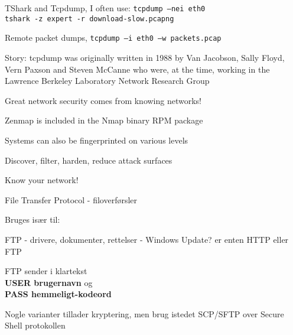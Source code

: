 \documentclass[Screen16to9,17pt]{foils}
\begin{document}
\begin{list2}
\item TShark and Tcpdump, I often use: \verb+tcpdump –nei eth0+\\
\verb+tshark -z expert -r download-slow.pcapng+

\item Remote packet dumps, \verb+tcpdump –i eth0 –w packets.pcap+

\item Story: tcpdump was originally written in 1988 by Van Jacobson, Sally Floyd, Vern Paxson and Steven McCanne who were, at the time, working in the Lawrence Berkeley Laboratory Network Research Group\\
\end{list2}

\vskip 5mm

\centerline{\Large Great network security comes from knowing networks!}





\centerline{Zenmap is included in the Nmap binary RPM package }





\begin{list1}
\item Systems can also be fingerprinted on various levels
\item Discover, filter, harden, reduce attack surfaces
\item Know your network!
\end{list1}




\begin{list1}
\item File Transfer Protocol - filoverførsler
\item Bruges især til:
  \begin{list2}
    \item FTP - drivere, dokumenter, rettelser - Windows Update? er
    enten HTTP eller FTP
  \end{list2}
\item FTP sender i klartekst\\
{\bfseries USER brugernavn} og \\
{\bfseries PASS hemmeligt-kodeord}
\item Nogle varianter tillader kryptering, men brug istedet SCP/SFTP over Secure Shell protokollen
\end{list1}
\end{document}
